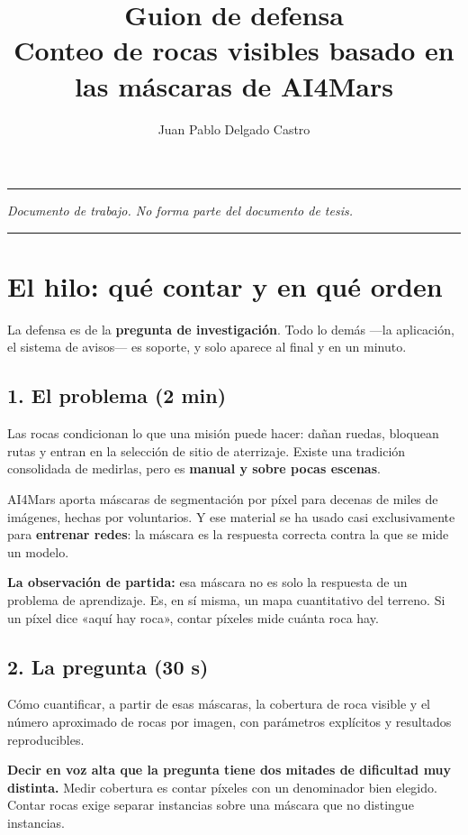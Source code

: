 \documentclass[11pt]{article}
\title{\vspace{-1.5cm}\textbf{Guion de defensa}\\[2mm]
\large Conteo de rocas visibles basado en las máscaras de AI4Mars}
\author{Juan Pablo Delgado Castro}
\date{}
\newcommand{\clave}[1]{\noindent\textbf{#1}}
\begin{document}
\maketitle
\thispagestyle{empty}

\noindent\rule{\textwidth}{0.4pt}
\begin{center}
\textit{Documento de trabajo. No forma parte del documento de tesis.}
\end{center}
\noindent\rule{\textwidth}{0.4pt}

\vspace{4mm}

\section{El hilo: qué contar y en qué orden}

La defensa es de la \textbf{pregunta de investigación}. Todo lo demás —la aplicación, el
sistema de avisos— es soporte, y solo aparece al final y en un minuto.

\subsection*{1. El problema (2 min)}

Las rocas condicionan lo que una misión puede hacer: dañan ruedas, bloquean rutas y entran
en la selección de sitio de aterrizaje. Existe una tradición consolidada de medirlas, pero
es \textbf{manual y sobre pocas escenas}.

AI4Mars aporta máscaras de segmentación por píxel para decenas de miles de imágenes,
hechas por voluntarios. Y ese material se ha usado casi exclusivamente para \textbf{entrenar
redes}: la máscara es la respuesta correcta contra la que se mide un modelo.

\clave{La observación de partida:} esa máscara no es solo la respuesta de un problema de
aprendizaje. Es, en sí misma, un mapa cuantitativo del terreno. Si un píxel dice «aquí hay
roca», contar píxeles mide cuánta roca hay.

\subsection*{2. La pregunta (30 s)}

Cómo cuantificar, a partir de esas máscaras, la cobertura de roca visible y el número
aproximado de rocas por imagen, con parámetros explícitos y resultados reproducibles.

\clave{Decir en voz alta que la pregunta tiene dos mitades de dificultad muy distinta.}
Medir cobertura es contar píxeles con un denominador bien elegido. Contar rocas exige
separar instancias sobre una máscara que no distingue instancias.
\end{document}
